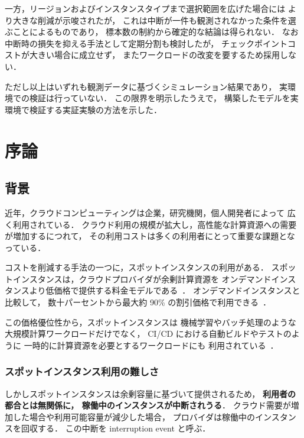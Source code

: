 \documentclass[11pt,a4paper]{ltjsreport}
\begin{document}
一方，リージョンおよびインスタンスタイプまで選択範囲を広げた場合には
より大きな削減が示唆されたが，
これは中断が一件も観測されなかった条件を選ぶことによるものであり，
標本数の制約から確定的な結論は得られない．
なお中断時の損失を抑える手法として定期分割も検討したが，
チェックポイントコストが大きい場合に成立せず，
またワークロードの改変を要するため採用しない．

ただし以上はいずれも観測データに基づくシミュレーション結果であり，
実環境での検証は行っていない．
この限界を明示したうえで，
構築したモデルを実環境で検証する実証実験の方法を示した．

\tableofcontents
\listoffigures
\listoftables

\chapter{序論}

\section{背景}
\label{sec:background}

近年，クラウドコンピューティングは企業，研究機関，個人開発者によって
広く利用されている．
クラウド利用の規模が拡大し，高性能な計算資源への需要が増加するにつれて，
その利用コストは多くの利用者にとって重要な課題となっている．

コストを削減する手法の一つに，スポットインスタンスの利用がある．
スポットインスタンスは，クラウドプロバイダが余剰計算資源を
オンデマンドインスタンスより低価格で提供する料金モデルである~\cite{AWSSpot}．
オンデマンドインスタンスと比較して，
数十パーセントから最大約 90\% の割引価格で利用できる~\cite{Lin2022Survey}．

この価格優位性から，スポットインスタンスは
機械学習やバッチ処理のような大規模計算ワークロードだけでなく，
CI/CD における自動ビルドやテストのように
一時的に計算資源を必要とするワークロードにも
利用されている~\cite{Ramesh2025}．

\subsection{スポットインスタンス利用の難しさ}

しかしスポットインスタンスは余剰容量に基づいて提供されるため，
\textbf{利用者の都合とは無関係に，
稼働中のインスタンスが中断されうる}．
クラウド需要が増加した場合や利用可能容量が減少した場合，
プロバイダは稼働中のインスタンスを回収する．
この中断を interruption event と呼ぶ．
\end{document}
